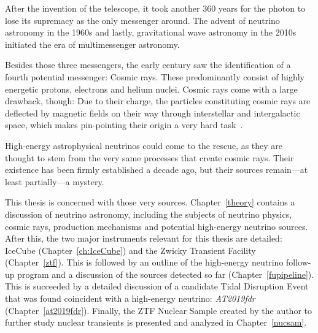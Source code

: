 After the invention of the telescope, it took another 360 years for the photon to lose its supremacy as the only messenger around. The advent of neutrino astronomy in the 1960s and lastly, gravitational wave astronomy in the 2010s initiated the era of multimessenger astronomy.

Besides those three messengers, the early  century saw the identification of a fourth potential messenger: Cosmic rays. These predominantly consist of highly energetic protons, electrons and helium nuclei. Cosmic rays come with a large drawback, though: Due to their charge, the particles constituting cosmic rays are deflected by magnetic fields on their way through interstellar and intergalactic space, which makes pin-pointing their origin a very hard task~\cite{Beckman2021}.

High-energy astrophysical neutrinos could come to the rescue, as they are thought to stem from the very same processes that create cosmic rays. Their existence has been firmly established a decade ago, but their sources remain---at least partially---a mystery.

This thesis is concerned with those very sources. Chapter~\ref{theory} contains a discussion of neutrino astronomy, including the subjects of neutrino physics, cosmic rays, production mechanisms and potential high-energy neutrino sources. After this, the two major instruments relevant for this thesis are detailed: IceCube (Chapter~\ref{ch:IceCube}) and the Zwicky Transient Facility (Chapter~\ref{ztf}). This is followed by an outline of the high-energy neutrino follow-up program and a discussion of the sources detected so far (Chapter~\ref{fupipeline}). This is succeeded by a detailed discussion of a candidate Tidal Disruption Event that was found coincident with a high-energy neutrino: \textit{AT2019fdr} (Chapter~\ref{at2019fdr}). Finally, the ZTF Nuclear Sample created by the author to further study nuclear transients is presented and analyzed in Chapter~\ref{nucsam}.
